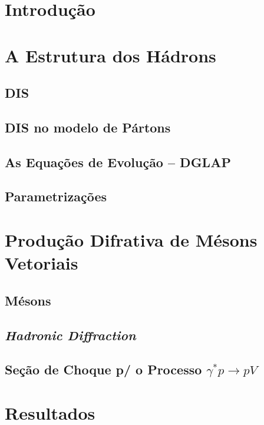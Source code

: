 
\section{Introdução}
\section{A Estrutura dos Hádrons}
\subsection{DIS}
\subsection{DIS no modelo de Pártons}
\subsection{As Equações de Evolução -- DGLAP}
\subsection{Parametrizações}
\section{Produção Difrativa de Mésons Vetoriais}
\subsection{Mésons}
\subsection{\textit{Hadronic Diffraction}}
\subsection{Seção de Choque p/  o Processo \texorpdfstring{${\gamma^{*}p\to pV}$}{lg}}
\section{Resultados}

